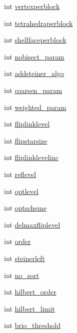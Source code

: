 \begin{DoxyCompactItemize}
int \hyperlink{classtetgenbehavior_a0706697ee85e4d4c7ea4b581df3c0786}{vertexperblock}
\item 
int \hyperlink{classtetgenbehavior_a8780a33de02550bb0197026cc4fa4dca}{tetrahedraperblock}
\item 
int \hyperlink{classtetgenbehavior_ade48168b9a70a4aacf9ef7ed52e967fe}{shellfaceperblock}
\item 
int \hyperlink{classtetgenbehavior_a6a331aa8b36d3f8dfee8b7fd8102520a}{nobisect\+\_\+param}
\item 
int \hyperlink{classtetgenbehavior_a660e5666e236d2e0fbd127fd56c9c493}{addsteiner\+\_\+algo}
\item 
int \hyperlink{classtetgenbehavior_a7280448201faf01cb571b2d1d09941f1}{coarsen\+\_\+param}
\item 
int \hyperlink{classtetgenbehavior_af7f32fedb214eab9b328974e2b564437}{weighted\+\_\+param}
\item 
int \hyperlink{classtetgenbehavior_a6fe8bf0c7357859461d45082caf4ee70}{fliplinklevel}
\item 
int \hyperlink{classtetgenbehavior_a4221b8b36b08a2a4107104cc959add20}{flipstarsize}
\item 
int \hyperlink{classtetgenbehavior_ae81513eea64eef16010a7bb998df3d5f}{fliplinklevelinc}
\item 
int \hyperlink{classtetgenbehavior_aedcb3e57800acfb18eb9a31766cf8477}{reflevel}
\item 
int \hyperlink{classtetgenbehavior_ae6d1777b2e5f9dad3921c778fc735717}{optlevel}
\item 
int \hyperlink{classtetgenbehavior_a4e5be08acac6b661a03e57efedd83ac9}{optscheme}
\item 
int \hyperlink{classtetgenbehavior_a4da6a5712b049c2bd9585fb6fe1d6cba}{delmaxfliplevel}
\item 
int \hyperlink{classtetgenbehavior_a47550f681968e6674f3c78b395d59df8}{order}
\item 
int \hyperlink{classtetgenbehavior_af6347b10c32052915e93e693d5cd687a}{steinerleft}
\item 
int \hyperlink{classtetgenbehavior_aa028ef7527ddb92cf8be45596424dd2f}{no\+\_\+sort}
\item 
int \hyperlink{classtetgenbehavior_a24291eedf8d006b92321d07d466fa19a}{hilbert\+\_\+order}
\item 
int \hyperlink{classtetgenbehavior_ad77c5217ba8b78246f179eb1f98df22f}{hilbert\+\_\+limit}
\item 
int \hyperlink{classtetgenbehavior_a0fae1ef28e8ba36da70912c73e5cc8b5}{brio\+\_\+threshold}

\end{DoxyCompactItemize}
